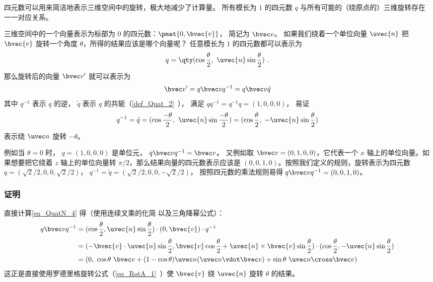 

四元数可以用来简洁地表示三维空间中的旋转，极大地减少了计算量。 所有模长为 $1$ 的四元数 $q$ 与所有可能的（绕原点的）三维旋转存在一一对应关系。

三维空间中的一个向量表示为标部为 $0$ 的四元数：$\pmat{0, \bvec{v}}$， 简记为 $\bvec v$。 如果我们绕着一个单位向量 ${\uvec{n}}$ 把 $\bvec{v}$ 旋转一个角度 $\theta$，所得的结果应该是哪个向量呢？ 任意模长为 $1$ 的四元数都可以表示为
\begin{equation}
q = \qty(\cos{\frac{\theta}{2}},\ {\uvec{n}}\sin{\frac{\theta}{2}})~.
\end{equation}
那么旋转后的向量 $\bvec v'$ 就可以表示为
\begin{equation}\label{eq_QuatN_4}
\bvec v' = q\bvec vq^{-1} = q\bvec v \tilde q
\end{equation}
其中 $q^{-1}$ 表示 $q$ 的逆， $\tilde q$ 表示 $q$ 的共轭（\autoref{def_Quat_2}~）， 满足 $qq^{-1} = q^{-1}q = (1,0,0,0)$， 易证
\begin{equation}
q^{-1} = \tilde q = (\cos{\frac{-\theta}{2}},\ {\uvec{n}}\sin{\frac{-\theta}{2}})
= (\cos{\frac{\theta}{2}},\ -{\uvec{n}}\sin{\frac{\theta}{2}})
\end{equation}
表示绕 $\uvec n$ 旋转 $-\theta$。

例如当 $\theta = 0$ 时， $q = (1,0,0,0)$ 是单位元， $q\bvec vq^{-1} = \bvec v$。 又例如取 $\bvec v = (0, 1, 0, 0)$，它代表一个 $x$ 轴上的单位向量。如果想要把它绕着 $z$ 轴上的单位向量转 $\pi/2$，那么结果向量的四元数表示应该是 $(0, 0, 1, 0)$。按照我们定义的规则，旋转表示为四元数 $q=(\sqrt{2}/2, 0, 0, \sqrt{2}/2)$， $q^{-1} = \tilde q = (\sqrt{2}/2,0,0,-\sqrt{2}/2)$， 按照四元数的乘法规则易得 $q\bvec v q^{-1}=(0,0,1,0)$。

\subsubsection{证明}
直接计算\autoref{eq_QuatN_4} 得（使用连续叉乘的化简 以及三角降幂公式）：
\begin{equation}
\begin{aligned}
q\bvec vq^{-1}&= (\cos{\frac{\theta}{2}}, {\uvec{n}}\sin{\frac{\theta}{2}})\cdot (0, \bvec{v})\cdot q^{-1}\\&
=(-\bvec{v}\cdot {\uvec{n}}\sin{\frac{\theta}{2}}, \bvec{v}\cos{\frac{\theta}{2}}+ {\uvec{n}}\times\bvec{v}\sin{\frac{\theta}{2}})\cdot (\cos{\frac{\theta}{2}}, -{\uvec{n}}\sin{\frac{\theta}{2}})\\&
= (0,\ \cos\theta\ \bvec v + (1-\cos\theta)\uvec n(\uvec n\vdot \bvec v) + \sin\theta\ \uvec n\cross\bvec v)
\end{aligned}
\end{equation}
这正是直接使用罗德里格旋转公式（\autoref{eq_RotA_1}~）使 $\bvec{v}$ 绕 ${\uvec{n}}$ 旋转 $\theta$ 的结果。

